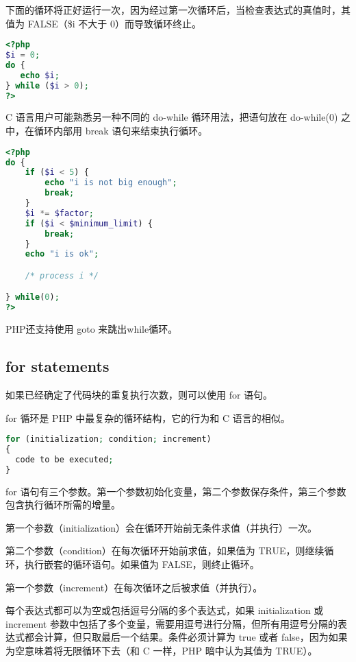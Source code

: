 下面的循环将正好运行一次，因为经过第一次循环后，当检查表达式的真值时，其值为 FALSE（\$i 不大于 0）而导致循环终止。

\begin{lstlisting}[language=PHP]
<?php
$i = 0;
do {
   echo $i;
} while ($i > 0);
?>
\end{lstlisting}


C 语言用户可能熟悉另一种不同的 do-while 循环用法，把语句放在 do-while(0) 之中，在循环内部用 break 语句来结束执行循环。


\begin{lstlisting}[language=PHP]
<?php
do {
    if ($i < 5) {
        echo "i is not big enough";
        break;
    }
    $i *= $factor;
    if ($i < $minimum_limit) {
        break;
    }
    echo "i is ok";

    /* process i */

} while(0);
?>
\end{lstlisting}

PHP还支持使用 goto 来跳出while循环。


\subsection{for statements}

如果已经确定了代码块的重复执行次数，则可以使用 for 语句。

for 循环是 PHP 中最复杂的循环结构，它的行为和 C 语言的相似。 

\begin{lstlisting}[language=PHP]
for (initialization; condition; increment)
{
  code to be executed;
}
\end{lstlisting}




for 语句有三个参数。第一个参数初始化变量，第二个参数保存条件，第三个参数包含执行循环所需的增量。

\begin{compactitem}
\item 第一个参数（initialization）会在循环开始前无条件求值（并执行）一次。
\item 第二个参数（condition）在每次循环开始前求值，如果值为 TRUE，则继续循环，执行嵌套的循环语句。如果值为 FALSE，则终止循环。
\item 第一个参数（increment）在每次循环之后被求值（并执行）。
\end{compactitem}




每个表达式都可以为空或包括逗号分隔的多个表达式，如果 initialization 或 increment 参数中包括了多个变量，需要用逗号进行分隔，但所有用逗号分隔的表达式都会计算，但只取最后一个结果。条件必须计算为 true 或者 false，因为如果为空意味着将无限循环下去（和 C 一样，PHP 暗中认为其值为 TRUE）。

